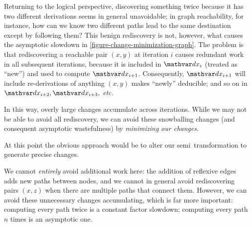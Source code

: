 Returning to the logical perspective, discovering something twice because it has two different derivations seems in general unavoidable; in graph reachability, for instance, how can we know two different paths lead to the same destination except by following them?
%
This benign rediscovery is not, however, what causes the asymptotic slowdown in \cref{figure-change-minimization-graph}.
%
The problem is that rediscovering a reachable pair $(x,y)$ at iteration $i$ causes redundant work in all subsequent iterations, because it is included in $\dx_i$ (treated as ``new'') and used to compute $\dx_{i+1}$.
%
Consequently, $\dx_{i+1}$ will include re-derivations of anything $(x,y)$ makes ``newly'' deducible; and so on in $\dx_{i+2}, \dx_{i+3},$ \emph{etc.}

In this way, overly large changes accumulate across iterations.
%
While we may not be able to avoid all rediscovery, we can avoid these snowballing changes (and consequent asymptotic wastefulness) by \emph{minimizing our changes}.


At this point the obvious approach would be to alter our semi\naive\ transformation to generate precise changes. \XXX

\XXX

\noindent
%
We cannot \emph{entirely} avoid additional work here: the addition of reflexive edges adds new paths between nodes, and we cannot in general avoid rediscovering pairs $(x,z)$ when there are multiple paths that connect them.
%
However, we can avoid these unnecessary changes accumulating, which is far more important: computing every path twice is a constant factor slowdown; computing every path $n$ times is an asymptotic one.


